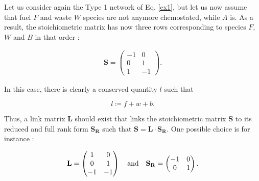 \documentclass{article}
\begin{document}
	Let us consider again the Type 1 network of Eq. \ref{ex1}, but let us now assume that fuel $F$ and waste $W$ species are not anymore chemostated, while $A$ is.
	As a result, the stoichiometric matrix has now three rows corresponding to species $F$, $W$ and $B$ in that order :
	\begin{center}
		\begin{equation}
			\begin{aligned}
				\mathbf{S} = \begin{pmatrix}
					-1 & 0 \\
					0 & 1 \\
					1 & -1
				\end{pmatrix}.
			\end{aligned}
		\end{equation}
	\end{center}
	In this case, there is clearly a conserved quantity $l$ such that 
	\begin{center}
		\begin{equation}
			l \coloneqq f + w + b.
			\label{113}
		\end{equation}
	\end{center}
	
	Thus, a link matrix $\mathbf{L}$ should exist that links the stoichiometric matrix $\mathbf{S}$ to its reduced and full rank form $\mathbf{S_R}$ such that $\mathbf{S} = \mathbf{L} \cdot \mathbf{S_R}$. One possible choice is for instance :
	\begin{center}
		\begin{equation}
			\begin{aligned}
				\mathbf{L} = \begin{pmatrix}
					1 & 0 \\
					0 & 1 \\
					-1 & -1
				\end{pmatrix} \quad {\rm and} \quad
				\mathbf{S_R} = \begin{pmatrix}
					-1 & 0 \\
					0 & 1
				\end{pmatrix}.
			\end{aligned}
		\end{equation}
	\end{center}
	
\end{document}
